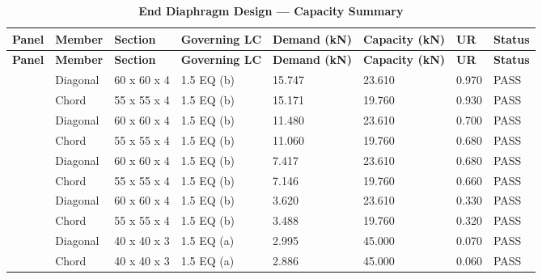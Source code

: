 \documentclass[12pt,a4paper]{report}
\numberwithin{table}{chapter}
\numberwithin{figure}{chapter}
\newcommand{\ReportTableRowGap}{6pt}
\begin{document}
\begin{longtable}{|C{2.0cm}|L{1.8cm}|C{2.2cm}|C{3.0cm}|C{1.8cm}|C{1.8cm}|C{1.2cm}|C{1.8cm}|}
\caption{\textbf{End Diaphragm Design --- Capacity Summary}}\\
\hline
\textbf{Panel} & \textbf{Member} & \textbf{Section} & \textbf{Governing LC} & \textbf{Demand (kN)} & \textbf{Capacity (kN)} & \textbf{UR} & \textbf{Status} \\[\ReportTableRowGap]
\hline
\endfirsthead
\hline
\textbf{Panel} & \textbf{Member} & \textbf{Section} & \textbf{Governing LC} & \textbf{Demand (kN)} & \textbf{Capacity (kN)} & \textbf{UR} & \textbf{Status} \\[\ReportTableRowGap]
\hline
\endhead

 & Diagonal & 60 x 60 x 4 & 1.5 EQ (b) & 15.747 & 23.610 & 0.970 & \textcolor{reportBlack}{PASS} \\[\ReportTableRowGap]
 & Chord & 55 x 55 x 4 & 1.5 EQ (b) & 15.171 & 19.760 & 0.930 & \textcolor{reportBlack}{PASS} \\[\ReportTableRowGap]
\hline
{} & Diagonal & 60 x 60 x 4 & 1.5 EQ (b) & 11.480 & 23.610 & 0.700 & \textcolor{reportBlack}{PASS} \\[\ReportTableRowGap]
 & Chord & 55 x 55 x 4 & 1.5 EQ (b) & 11.060 & 19.760 & 0.680 & \textcolor{reportBlack}{PASS} \\[\ReportTableRowGap]
\hline
{} & Diagonal & 60 x 60 x 4 & 1.5 EQ (b) & 7.417 & 23.610 & 0.680 & \textcolor{reportBlack}{PASS} \\[\ReportTableRowGap]
 & Chord & 55 x 55 x 4 & 1.5 EQ (b) & 7.146 & 19.760 & 0.660 & \textcolor{reportBlack}{PASS} \\[\ReportTableRowGap]
\hline
{} & Diagonal & 60 x 60 x 4 & 1.5 EQ (b) & 3.620 & 23.610 & 0.330 & \textcolor{reportBlack}{PASS} \\[\ReportTableRowGap]
 & Chord & 55 x 55 x 4 & 1.5 EQ (b) & 3.488 & 19.760 & 0.320 & \textcolor{reportBlack}{PASS} \\[\ReportTableRowGap]
\hline
{} & Diagonal & 40 x 40 x 3 & 1.5 EQ (a) & 2.995 & 45.000 & 0.070 & \textcolor{reportBlack}{PASS} \\[\ReportTableRowGap]
 & Chord & 40 x 40 x 3 & 1.5 EQ (a) & 2.886 & 45.000 & 0.060 & \textcolor{reportBlack}{PASS} \\[\ReportTableRowGap]

\end{longtable}
\end{document}
